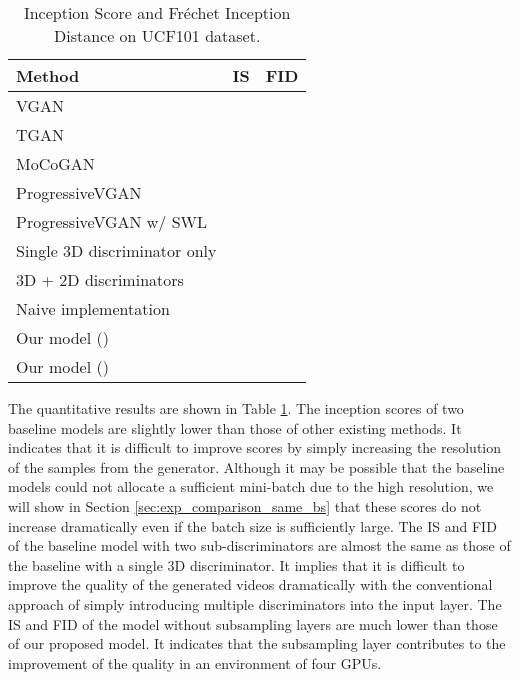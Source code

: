 \documentclass[twocolumn]{svjour3}
\def\Table#1{Table \ref{table:#1}}
\def\Sec#1{Section \ref{sec:#1}}
\begin{document}
\begin{table}[t]
\centering
{\renewcommand{\arraystretch}{1.2}
\begin{tabular}{lll}
Method & IS & FID \\ \hline \hline
VGAN \cite{Vondrick2016} &  \\
TGAN \cite{Saito2017} &  \\
MoCoGAN \cite{Tulyakov2018} &  \\
ProgressiveVGAN \cite{Acharya2018} &  \\
ProgressiveVGAN w/ SWL \cite{Acharya2018} &  \\ \hline
Single 3D discriminator only &  &  \\
3D + 2D discriminators &  &  \\
Naive implementation &  &  \\ \hline






Our model () &  &  \\
Our model () &  &  \\ \hline
\end{tabular}
}
\caption{Inception Score and Fr\'echet Inception Distance on UCF101 dataset.}
\label{table:inception_score}
\vspace{-10pt}
\end{table}























The quantitative results are shown in \Table{inception_score}.
The inception scores of two baseline models are slightly lower than those of other existing methods.
It indicates that it is difficult to improve scores
by simply increasing the resolution of the samples from the generator.
Although it may be possible that the baseline models could not allocate a sufficient mini-batch
due to the high resolution, we will show in \Sec{exp_comparison_same_bs} that
these scores do not increase dramatically even if the batch size is sufficiently large.
The IS and FID of the baseline model with two sub-discriminators are almost the same
as those of the baseline with a single 3D discriminator.
It implies that it is difficult to improve the quality of the generated videos dramatically
with the conventional approach of simply introducing multiple discriminators into the input layer.
The IS and FID of the model without subsampling layers are much lower than those of our proposed model.
It indicates that the subsampling layer contributes to the improvement of the quality
in an environment of four GPUs.
\end{document}
